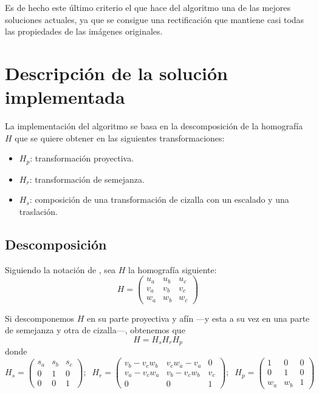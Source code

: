 \documentclass[a4paper, 11pt]{article}
\theoremstyle{definition}
\begin{document}
    Es de hecho este último criterio el que hace del algoritmo una de las mejores soluciones actuales, ya que se consigue una rectificación que mantiene casi todas las propiedades de las imágenes originales.


    \section{Descripción de la solución implementada}

    La implementación del algoritmo se basa en la descomposición de la homografía $H$ que se quiere obtener en las siguientes transformaciones:
    \begin{itemize}
        \item $H_p$: transformación proyectiva.
        \item $H_r$: transformación de semejanza.
        \item $H_s$: composición de una transformación de cizalla con un escalado y una traslación.
    \end{itemize}

    \subsection{Descomposición}
    Siguiendo la notación de \cite{LoopZhang}, sea $H$ la homografía siguiente:
    \[
    H =
    \begin{pmatrix}
        u_a & u_b & u_c \\
        v_a & v_b & v_c \\
        w_a & w_b & w_c
    \end{pmatrix}
    \]

    Si descomponemos $H$ en su parte proyectiva y afín ---y esta a su vez en una parte de semejanza y otra de cizalla---, obtenemos que
    \[
    H = H_s H_r H_p
    \]
    donde
    \[
    H_s =
    \begin{pmatrix}
        s_a & s_b & s_c \\
        0 & 1 & 0 \\
        0 & 0 & 1
    \end{pmatrix};\;\;
    H_r =
    \begin{pmatrix}
        v_b - v_c w_b & v_c w_a - v_a & 0 \\
        v_a - v_c w_a & v_b - v_c w_b & v_c \\
        0 & 0 & 1
    \end{pmatrix};\;\;
    H_p =
    \begin{pmatrix}
        1 & 0 & 0 \\
        0 & 1 & 0 \\
        w_a & w_b & 1
    \end{pmatrix}
    \]
\end{document}
